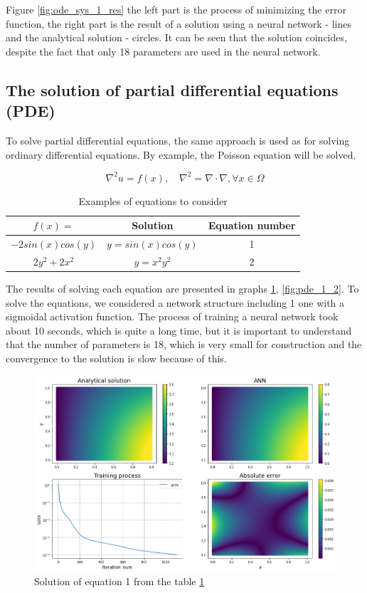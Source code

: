 Figure \ref{fig:ode_sys_1_res} the left part is the process of minimizing the error function, the right part is the result of a solution using a neural network - lines and the analytical solution - circles. It can be seen that the solution coincides, despite the fact that only 18 parameters are used in the neural network.

\subsection{The solution of partial differential equations (PDE)}

To solve partial differential equations, the same approach is used as for solving ordinary differential equations. By example, the Poisson equation will be solved.

\begin{equation*}
	\nabla^2 u = f(x), \quad \nabla^2 = \nabla \cdot \nabla, \forall x \in \Omega
\end{equation*}

\begin{table}
	\centering
	\begin{tabular}{| c | c | c |} 
		\hline
		$f(x) = $ & Solution & Equation number \\ \hline
		$ -2 sin(x) cos(y) $ & $ y = sin(x) cos(y) $ & 1\\
		$ 2 y^2 + 2 x^2 $ & $ y = x^2 y^2 $ & 2\\ \hline
	\end{tabular}
	\caption{Examples of equations to consider}
	\label{table:pde1_tab}
\end{table}

The results of solving each equation are presented in graphs \ref{fig:pde_1_1}, \ref{fig:pde_1_2}. To solve the equations, we considered a network structure including 1 one with a sigmoidal activation function. The process of training a neural network took about 10 seconds, which is quite a long time, but it is important to understand that the number of parameters is 18, which is very small for construction and the convergence to the solution is slow because of this.

\begin{figure}
	\centering
	\includegraphics[width=\textwidth]{images/chapter2/pde_1_1.png}
	\caption{Solution of equation 1 from the table \ref{table:pde1_tab}}
	\label{fig:pde_1_1}
\end{figure}

